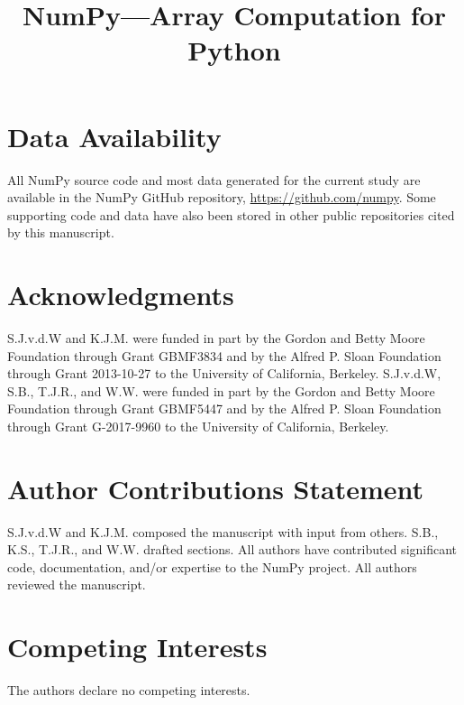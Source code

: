 \documentclass[fleqn,10pt,twocolumn]{wlscirep}
\title{NumPy---Array Computation for Python}
\begin{document}
\flushbottom
\maketitle
\thispagestyle{empty}







\section*{Data Availability}

All NumPy source code and most data generated for the current study are
available in the NumPy GitHub repository, \url{https://github.com/numpy}. Some
supporting code and data have also been stored in other public repositories
cited by this manuscript.



\section*{Acknowledgments}

S.J.v.d.W and K.J.M. were funded in part by the Gordon and Betty Moore
Foundation through Grant GBMF3834 and by the Alfred P. Sloan Foundation through
Grant 2013-10-27 to the University of California, Berkeley.
S.J.v.d.W, S.B., T.J.R., and W.W. were funded in part by the Gordon
and Betty Moore Foundation through Grant GBMF5447 and by the Alfred
P. Sloan Foundation through Grant G-2017-9960 to the University of
California, Berkeley.


\section*{Author Contributions Statement}

S.J.v.d.W and K.J.M. composed the manuscript with input from others.
S.B., K.S., T.J.R., and W.W. drafted sections.
All authors have contributed significant code, documentation, and/or expertise
to the NumPy project.
All authors reviewed the manuscript.

\section*{Competing Interests}

The authors declare no competing interests.
\end{document}
